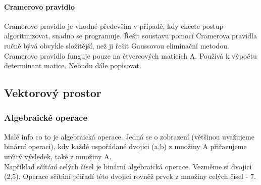 \documentclass[10pt,a4paper]{article}
\begin{document}
\paragraph{Cramerovo pravidlo}
Cramerovo pravidlo je vhodné především v případě, kdy chcete postup algoritmizovat, snadno se programuje. Řešit soustavu pomocí Cramerova pravidla ručně bývá obvykle složitější, než ji řešit Gaussovou eliminační metodou.\\
Cramerovo pravidlo funguje pouze na čtvercových maticích A. Používá k výpočtu determinant matice. Nebudu dále popisovat.
\subsection{Vektorový prostor}
\subsubsection{Algebraické operace}
Malé info co to je algebraická operace. Jedná se o zobrazení (většinou uvažujeme binární operaci), kdy každé uspořádané dvojici (a,b) z množiny A přiřazujeme určitý výsledek, také z množiny A.\\
Například sčítání celých čísel je binární algebraická operace. Vezměme si dvojici (2,5). Operace sčítání přiřadí této dvojici rovněž prvek z množiny celých čísel - 7.
\end{document}
